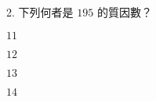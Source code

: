 \documentclass[12pt]{article}
\begin{document}
\begin{problem}
  \item[2.] 下列何者是 $195$ 的質因數？
  \begin{choices}
    \item $11$
    \item $12$
    \item $13$
    \item $14$
  \end{choices}
\end{problem}
\end{document}
